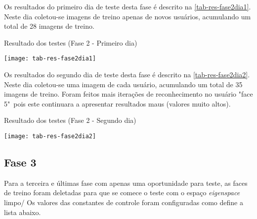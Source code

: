 Os resultados do primeiro dia de teste desta fase é descrito na \autoref{tab-res-fase2dia1}. Neste dia coletou-se imagens de treino apenas de novos usuários, acumulando um total de 28 imagens de treino. 


\begin{table}[h]
	\centering
	\caption{Resultado dos testes (Fase 2 - Primeiro dia) }
	\texttt{[image: tab-res-fase2dia1]}
	\label{tab-res-fase2dia1}
\end{table}


Os resultados do segundo dia de teste desta fase é descrito na \autoref{tab-res-fase2dia2}. Neste dia coletou-se uma imagem de cada usuário, acumulando um total de 35 imagens de treino. Foram feitos mais iterações de reconhecimento no usuário "face 5"\ pois este continuara a apresentar resultados maus (valores muito altos).


\begin{table}[h]
	\centering
	\caption{Resultado dos testes (Fase 2 - Segundo dia) }
	\texttt{[image: tab-res-fase2dia2]}
	\label{tab-res-fase2dia2}
\end{table}



\subsection{Fase 3}\label{ch:testresultfaz3}
Para a terceira e últimas fase com apenas uma oportunidade para teste, as faces de treino foram deletadas para que se comece o teste com o espaço \textit{eigenspace} limpo/ Os valores das constantes de controle foram configuradas como define a lista abaixo.

